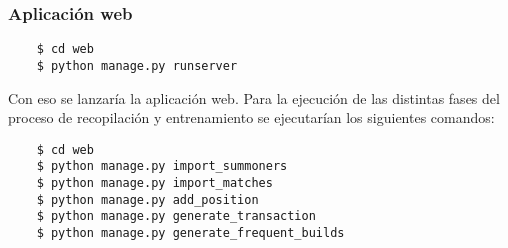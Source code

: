 \subsubsection{Aplicación web}
\begin{lstlisting}
	$ cd web
	$ python manage.py runserver
\end{lstlisting}
Con eso se lanzaría la aplicación web. Para la ejecución de las distintas fases del proceso de recopilación y entrenamiento se ejecutarían los siguientes comandos:
\begin{lstlisting}
	$ cd web
	$ python manage.py import_summoners
	$ python manage.py import_matches
	$ python manage.py add_position
	$ python manage.py generate_transaction
	$ python manage.py generate_frequent_builds
\end{lstlisting}

